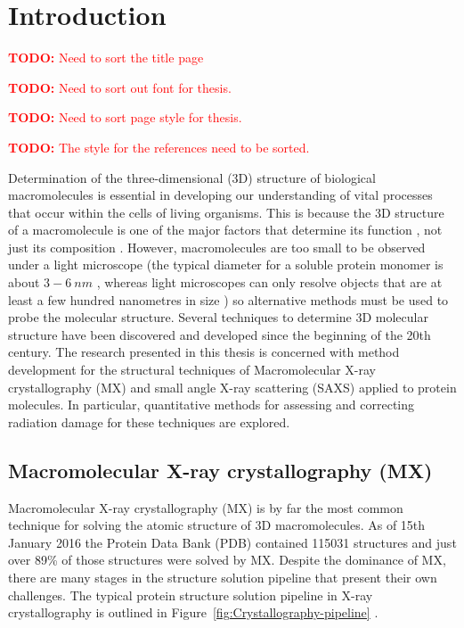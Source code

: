 \chapter{Introduction}
\label{chap:Introduction}
    \textcolor{red}{
        \begin{myenumerate}
            \item \hypertarget{todo:SortTitlePage}{\textbf{TODO:} Need to sort the title page}
            \item \hypertarget{todo:SortTextFont}{\textbf{TODO:} Need to sort out font for thesis.}
            \item \hypertarget{todo:SortPageStyle}{\textbf{TODO:} Need to sort page style for thesis.}
            \item \hypertarget{todo:SortReferenceStyle}{\textbf{TODO:} The style for the references need to be sorted.}
        \end{myenumerate}
    }
    Determination of the three-dimensional (3D) structure of biological macromolecules is essential in developing our understanding of vital processes that occur within the cells of living organisms.
    This is because the 3D structure of a macromolecule is one of the major factors that determine its function \cite[s~3.6]{berg2002}, not just its composition \cite{hegyi1999}.
    However, macromolecules are too small to be observed under a light microscope (the typical diameter for a soluble protein monomer is about $3-6\ nm$ \cite{Philips2015}, whereas light microscopes can only resolve objects that are at least a few hundred nanometres in size \cite[p~54]{starr2010}) so alternative methods must be used to probe the molecular structure.
    Several techniques to determine 3D molecular structure have been discovered and developed since the beginning of the 20th century.
    The research presented in this thesis is concerned with method development for the structural techniques of Macromolecular X-ray crystallography (MX) and small angle X-ray scattering (SAXS) applied to protein molecules.
    In particular, quantitative methods for assessing and correcting radiation damage for these techniques are explored.

\section{Macromolecular X-ray crystallography (MX)}
\label{sec:X-ray crystallography}

    Macromolecular X-ray crystallography (MX) is by far the most common technique for solving the atomic structure of 3D macromolecules.
    As of 15th January 2016 the Protein Data Bank (PDB) contained 115031 structures and just over 89\% of those structures were solved by MX.
    Despite the dominance of MX, there are many stages in the structure solution pipeline that present their own challenges.
    The typical protein structure solution pipeline in X-ray crystallography is outlined in Figure~\ref{fig:Crystallography-pipeline} \cite{garman2014}.

